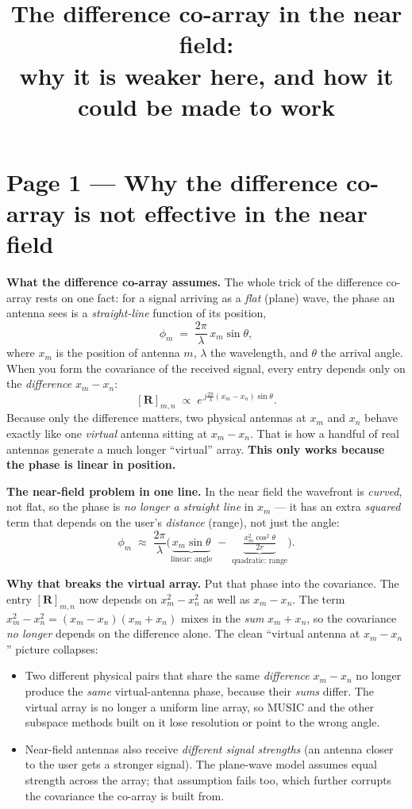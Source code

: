 \documentclass[10pt]{article}
\title{\vspace{-2.2em}\textbf{The difference co-array in the near field:\\ why it is weaker here, and how it could be made to work}}
\author{}
\date{}
\begin{document}
\maketitle
\vspace{-3.2em}

\section*{Page 1 --- Why the difference co-array is not effective in the near field}

\textbf{What the difference co-array assumes.} The whole trick of the difference co-array
rests on one fact: for a signal arriving as a \emph{flat} (plane) wave, the phase an antenna sees
is a \emph{straight-line} function of its position,
\[
\phi_m \;=\; \frac{2\pi}{\lambda}\, x_m \sin\theta ,
\]
where $x_m$ is the position of antenna $m$, $\lambda$ the wavelength, and $\theta$ the arrival
angle. When you form the covariance of the received signal, every entry depends only on the
\emph{difference} $x_m - x_n$:
\[
[\mathbf{R}]_{m,n} \;\propto\; e^{\,j\frac{2\pi}{\lambda}(x_m - x_n)\sin\theta}.
\]
Because only the difference matters, two physical antennas at $x_m$ and $x_n$ behave exactly like
one \emph{virtual} antenna sitting at $x_m - x_n$. That is how a handful of real antennas generate a
much longer ``virtual'' array. \textbf{This only works because the phase is linear in position.}

\begin{keybox}
\textbf{The near-field problem in one line.} In the near field the wavefront is \emph{curved}, not
flat, so the phase is \emph{no longer a straight line} in $x_m$ --- it has an extra \emph{squared}
term that depends on the user's \emph{distance} (range), not just the angle:
\[
\phi_m \;\approx\; \frac{2\pi}{\lambda}\Big(\underbrace{x_m\sin\theta}_{\text{linear: angle}}
\;-\; \underbrace{\tfrac{x_m^{2}\cos^{2}\theta}{2r}}_{\text{quadratic: range}}\Big).
\]
\end{keybox}

\textbf{Why that breaks the virtual array.} Put that phase into the covariance. The entry
$[\mathbf{R}]_{m,n}$ now depends on $x_m^{2}-x_n^{2}$ as well as $x_m-x_n$. The term
$x_m^{2}-x_n^{2}=(x_m-x_n)(x_m+x_n)$ mixes in the \emph{sum} $x_m+x_n$, so the covariance
\emph{no longer} depends on the difference alone. The clean ``virtual antenna at $x_m-x_n$''
picture collapses:
\begin{itemize}
\item Two different physical pairs that share the same \emph{difference} $x_m-x_n$ no longer produce
the \emph{same} virtual-antenna phase, because their \emph{sums} differ. The virtual array is no
longer a uniform line array, so MUSIC and the other subspace methods built on it lose resolution or
point to the wrong angle.
\item Near-field antennas also receive \emph{different signal strengths} (an antenna closer to the
user gets a stronger signal). The plane-wave model assumes equal strength across the array; that
assumption fails too, which further corrupts the covariance the co-array is built from.
\end{itemize}
\end{document}
